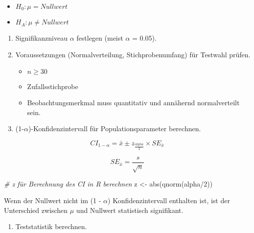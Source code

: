 \documentclass[
]{book}
\newenvironment{Shaded}{\begin{snugshade}}{\end{snugshade}}
\newcommand{\CommentTok}[1]{\textcolor[rgb]{0.56,0.35,0.01}{\textit{#1}}}
\newcommand{\DecValTok}[1]{\textcolor[rgb]{0.00,0.00,0.81}{#1}}
\newcommand{\FunctionTok}[1]{\textcolor[rgb]{0.00,0.00,0.00}{#1}}
\newcommand{\NormalTok}[1]{#1}
\newcommand{\OtherTok}[1]{\textcolor[rgb]{0.56,0.35,0.01}{#1}}
\newcommand{\SpecialCharTok}[1]{\textcolor[rgb]{0.00,0.00,0.00}{#1}}
\providecommand{\tightlist}{%
  \setlength{\itemsep}{0pt}\setlength{\parskip}{0pt}}
\begin{document}
\begin{itemize}
\tightlist
\item
  \(H_0: \mu = Nullwert\)\\
\item
  \(H_A: \mu \neq Nullwert\)
\end{itemize}

\begin{enumerate}
\def\labelenumi{\arabic{enumi}.}
\setcounter{enumi}{1}
\item
  Signifikanzniveau \(\alpha\) festlegen (meist \(\alpha\) = 0.05).
\item
  Voraussetzungen (Normalverteilung, Stichprobenumfang) für Testwahl prüfen.

  \begin{itemize}
  \tightlist
  \item
    \(n \geq 30\)
  \item
    Zufallsstichprobe\\
  \item
    Beobachtungsmerkmal muss quantitativ und annähernd normalverteilt sein.
  \end{itemize}
\item
  (1-\(\alpha\))-Konfidenzintervall für Populationsparameter berechnen.
\end{enumerate}

\begin{equation}
  CI_{1-\alpha} = \bar{x} \pm z_{\frac{alpha}{2}} \times SE_{\bar{x}}
  \label{eq:CI-ztest}
\end{equation}

\begin{equation}
  SE_{\bar{x}} = \frac{s}{\sqrt{n}}
  \label{eq:se-ztest}
\end{equation}

\begin{Shaded}
\begin{Highlighting}[]
\CommentTok{\# z für Berechnung des CI in R berechnen}
\NormalTok{z }\OtherTok{\textless{}{-}} \FunctionTok{abs}\NormalTok{(}\FunctionTok{qnorm}\NormalTok{(alpha}\SpecialCharTok{/}\DecValTok{2}\NormalTok{))}
\end{Highlighting}
\end{Shaded}

Wenn der Nullwert nicht im (1 - \(\alpha\)) Konfidenzintervall enthalten ist, ist der
Unterschied zwischen \(\mu\) und Nullwert statistisch signifikant.

\begin{enumerate}
\def\labelenumi{\arabic{enumi}.}
\setcounter{enumi}{4}
\tightlist
\item
  Teststatistik berechnen.
\end{enumerate}
\end{document}
